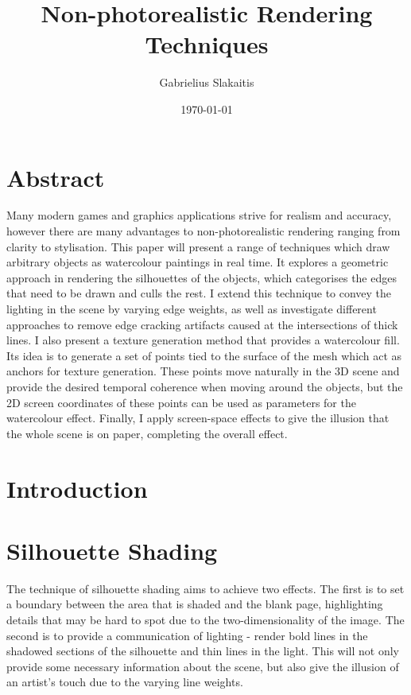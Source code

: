 \documentclass[a4paper, 12pt]{article}
\begin{document}
\title{Non-photorealistic Rendering Techniques}
\author{Gabrielius Slakaitis}
\date{\today}
\maketitle

\newpage



\section{Abstract}

Many modern games and graphics applications strive for realism and accuracy, however there are many advantages to non-photorealistic rendering ranging from clarity to stylisation. This paper will present a range of techniques which draw arbitrary objects as watercolour paintings in real time. It explores a geometric approach in rendering the silhouettes of the objects, which categorises the edges that need to be drawn and culls the rest. I extend this technique to convey the lighting in the scene by varying edge weights, as well as investigate different approaches to remove edge cracking artifacts caused at the intersections of thick lines. I also present a texture generation method that provides a watercolour fill. Its idea is to generate a set of points tied to the surface of the mesh which act as anchors for texture generation. These points move naturally in the 3D scene and provide the desired temporal coherence when moving around the objects, but the 2D screen coordinates of these points can be used as parameters for the watercolour effect. Finally, I apply screen-space effects to give the illusion that the whole scene is on paper, completing the overall effect.



\section{Introduction}



\section{Silhouette Shading}

The technique of silhouette shading aims to achieve two effects. The first is to set a boundary between the area that is shaded and the blank page, highlighting details that may be hard to spot due to the two-dimensionality of the image. The second is to provide a communication of lighting - render bold lines in the shadowed sections of the silhouette and thin lines in the light. This will not only provide some necessary information about the scene, but also give the illusion of an artist's touch due to the varying line weights.
\end{document}
